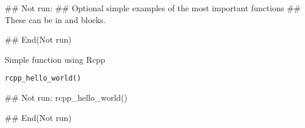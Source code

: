 \documentclass[a4paper]{book}
\begin{document}
%
\begin{Examples}
\begin{ExampleCode}
  ## Not run: 
     ## Optional simple examples of the most important functions
     ## These can be in \dontrun{} and \donttest{} blocks.   
  
## End(Not run)
\end{ExampleCode}
\end{Examples}
%
\begin{Description}\relax
Simple function using Rcpp
\end{Description}
%
\begin{Usage}
\begin{verbatim}
rcpp_hello_world()	
\end{verbatim}
\end{Usage}
%
\begin{Examples}
\begin{ExampleCode}
## Not run: 
rcpp_hello_world()

## End(Not run)
\end{ExampleCode}
\end{Examples}
\printindex{}
\end{document}
